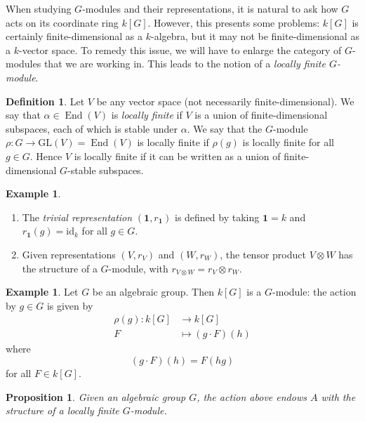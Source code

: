 \documentclass[10pt]{amsart}
\numberwithin{equation}{section}
\newcommand{\GL}{\mathrm{GL}}
\newcommand{\id}{\mathrm{id}}
\DeclareMathOperator{\End}{End}
\theoremstyle{plain}
\newtheorem{prop}[thm]{Proposition}
\theoremstyle{definition}
\newtheorem{defn}[thm]{Definition}
\newtheorem{ex}[thm]{Example}
\theoremstyle{remark}
\begin{document}
When studying $G$-modules and their representations, it is natural to ask how $G$ acts on its coordinate ring $k[G]$. However, this presents some problems: $k[G]$ is certainly finite-dimensional as a $k$-algebra, but it may not be finite-dimensional as a $k$-vector space. To remedy this issue, we will have to enlarge the category of $G$-modules that we are working in. This leads to the notion of a \emph{locally finite $G$-module}.

\begin{defn}
    Let $V$ be any vector space (not necessarily finite-dimensional). We say that $\alpha \in \End(V)$ is \emph{locally finite} if $V$ is a union of finite-dimensional subspaces, each of which is stable under $\alpha$. We say that the $G$-module $\rho: G \to \GL(V) = \End(V)$ is locally finite if $\rho(g)$ is locally finite for all $g \in G$. Hence $V$ is locally finite if it can be written as a union of finite-dimensional $G$-stable subspaces. 
\end{defn}
\begin{ex}
\hfill
\begin{enumerate}
\item The \emph{trivial representation} $(\mathbf{1}, r_\mathbf{1})$ is defined by taking $\mathbf{1} = k$ and $r_\mathbf{1}(g) = \id_k$ for all $g \in G$.
\item     Given representations $(V, r_V)$ and $(W, r_W)$, the tensor product $V \otimes W$ has the structure of a $G$-module, with $r_{V \otimes W} = r_V \otimes r_W$.   
\end{enumerate} 
\end{ex}
\begin{ex}\label{ex:1.5}
    Let $G$ be an algebraic group. Then $k[G]$ is a $G$-module: the action by $g \in G$ is given by
    \begin{align*}
        \rho(g): k[G] &\to k[G]\\
        F &\mapsto (g\cdot F)(h)
    \end{align*}
    where 
    \[(g \cdot F)(h) = F(hg)\]
    for all $F \in k[G]$. 
\end{ex}

\begin{prop}
    Given an algebraic group $G$, the action above endows $A$ with the structure of a locally finite $G$-module. 
\end{prop}
\end{document}
